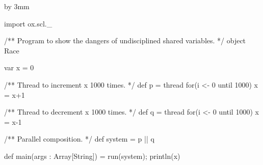 \documentclass[notes,color]{sepslide0}
\begin{document}

{\advance\slideheight by 3mm
\begin{slide}

\begin{scala}
import ox.scl._

/** Program to show the dangers of undisciplined shared variables. */
object Race{
  var x = 0

  /** Thread to increment x 1000 times. */
  def p = thread{ for(i <- 0 until 1000) x = x+1 }

  /** Thread to decrement x 1000 times. */
  def q = thread{ for(i <- 0 until 1000) x = x-1 }

  /** Parallel composition. */
  def system = p || q

  def main(args : Array[String]) = { run(system); println(x) }
}
\end{scala}%
\end{slide}}









\end{document}
